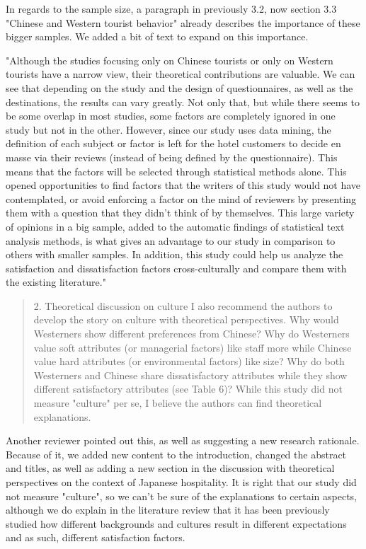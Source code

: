 \documentclass{letter}
\begin{document}
In regards to the sample size, a paragraph in previously 3.2, now section 3.3 "Chinese and Western tourist behavior" already describes the importance of these bigger samples. We added a bit of text to expand on this importance.

"Although the studies focusing only on Chinese tourists or only on Western tourists have a narrow view, their theoretical contributions are valuable. We can see that depending on the study and the design of questionnaires, as well as the destinations, the results can vary greatly. Not only that, but while there seems to be some overlap in most studies, some factors are completely ignored in one study but not in the other. However, since our study uses data mining, the definition of each subject or factor is left for the hotel customers to decide en masse via their reviews (instead of being defined by the questionnaire). This means that the factors will be selected through statistical methods alone. This opened opportunities to find factors that the writers of this study would not have contemplated, or avoid enforcing a factor on the mind of reviewers by presenting them with a question that they didn't think of by themselves. This large variety of opinions in a big sample, added to the automatic findings of statistical text analysis methods, is what gives an advantage to our study in comparison to others with smaller samples. In addition, this study could help us analyze the satisfaction and dissatisfaction factors cross-culturally and compare them with the existing literature."



\begin{quotation}
2. Theoretical discussion on culture
I also recommend the authors to develop the story on culture with theoretical perspectives. Why would Westerners show different preferences from Chinese? Why do Westerners value soft attributes (or managerial factors) like staff more while Chinese value hard attributes (or environmental factors) like size? Why do both Westerners and Chinese share dissatisfactory attributes while they show different satisfactory attributes (see Table 6)? While this study did not measure "culture" per se, I believe the authors can find theoretical explanations.
\end{quotation}


Another reviewer pointed out this, as well as suggesting a new research rationale. Because of it, we added new content to the introduction, changed the abstract and titles, as well as adding a new section in the discussion with theoretical perspectives on the context of Japanese hospitality. It is right that our study did not measure "culture", so we can't be sure of the explanations to certain aspects, although we do explain in the literature review that it has been previously studied how different backgrounds and cultures result in different expectations and as such, different satisfaction factors. 
\end{document}
